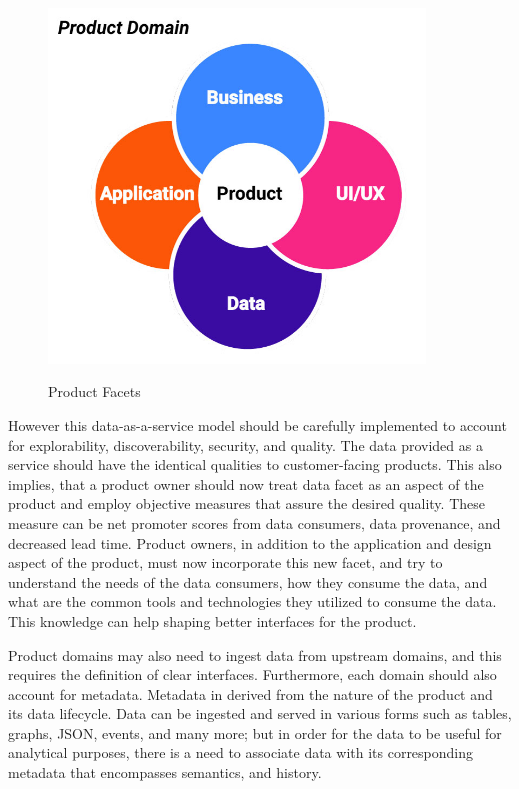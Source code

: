 \documentclass[review]{elsarticle}
\begin{document}
\begin{figure}[h!]
    \centering
    \includegraphics[width=10cm]{Media/product-facets.jpg}
    \label{data-facets}
    \caption{Product Facets}
\end{figure}

However this data-as-a-service model should be carefully implemented to account for explorability, discoverability, security, and quality. The data provided as a service should have the identical qualities to customer-facing products. This also implies, that a product owner should now treat data facet as an aspect of the product and employ objective measures that assure the desired quality. These measure can be net promoter scores from data consumers, data provenance, and decreased lead time. Product owners, in addition to the application and design aspect of the product, must now incorporate this new facet, and try to understand the needs of the data consumers, how they consume the data, and what are the common tools and technologies they utilized to consume the data. This knowledge can help shaping better interfaces for the product.

Product domains may also need to ingest data from upstream domains, and this requires the definition of clear interfaces. Furthermore, each domain should also account for metadata. Metadata in derived from the nature of the product and its data lifecycle. Data can be ingested and served in various forms such as tables, graphs, JSON, events, and many more; but in order for the data to be useful for analytical purposes, there is a need to associate data with its corresponding metadata that encompasses semantics, and history.
\end{document}
